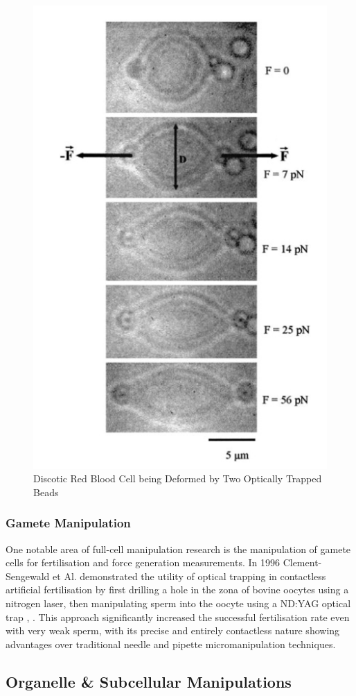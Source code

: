 \documentclass{article}
\begin{document}
\begin{figure}[h!]
    \begin{center}
    \includegraphics[width=0.5\linewidth]{Pictures/rbc.png}
    \caption{Discotic Red Blood Cell being Deformed by Two Optically Trapped Beads}
    \label{fig:rbc}
    \end{center}
\end{figure}
\newpage

\subsubsection*{Gamete Manipulation}

One notable area of full-cell manipulation research is the manipulation of gamete cells for fertilisation and force generation measurements. In 1996 Clement-Sengewald et Al. demonstrated the utility of optical trapping in contactless artificial fertilisation by first drilling a hole in the zona of bovine oocytes using a nitrogen laser, then manipulating sperm into the oocyte using a ND:YAG optical trap \cite{Clement-Sengewald1996-lc}, \cite{Antinori1996-dt}. This approach significantly increased the successful fertilisation rate even with very weak sperm, with its precise and entirely contactless nature showing advantages over traditional needle and pipette micromanipulation techniques.


\subsection*{Organelle \& Subcellular Manipulations}
\end{document}
